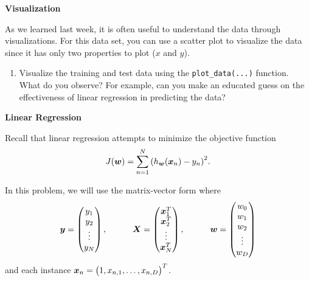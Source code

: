 \documentclass[11pt]{article}
\begin{document}
\vspace{10pt} {\large \textbf{Visualization} }

As we learned last week, it is often useful to understand the data through visualizations. For this data set, you can use a scatter plot to visualize the data since it has only two properties to plot ($x$ and $y$).

\begin{enumerate}

\item {} Visualize the training and test data using the \verb|plot_data(...)| function. What do you observe? For example, can you make an educated guess on the effectiveness of linear regression in predicting the data?


\solution{

}

\end{enumerate}



\newpage
\vspace{10pt} {\large \textbf{Linear Regression} }

Recall that linear regression attempts to minimize the objective function
\begin{equation*}
J(\boldsymbol{w}) =  \sum_{n=1}^{N}{\left(h_{\boldsymbol{w}}(\boldsymbol{x}_{n}) - y_{n}\right)^2}.
\end{equation*}

In this problem, we will use the matrix-vector form where
\begin{equation*}
\boldsymbol{y} =\begin{pmatrix}
y_{1}\\
y_{2}\\
\vdots\\
y_{N}
\end{pmatrix},
\quad \quad \quad
\boldsymbol{X} = \begin{pmatrix}
\boldsymbol{x}_{1}^T \\
\boldsymbol{x}_{2}^T  \\
\vdots  \\
\boldsymbol{x}_{N}^T  \\
\end{pmatrix},
\quad \quad \quad
\boldsymbol{w} = \begin{pmatrix}
w_0\\
w_1\\
w_2\\
\vdots\\
w_D
\end{pmatrix}
\end{equation*}
and each instance $\boldsymbol{x}_{n} = \bigl( 1, x_{n,1}, \ldots, x_{n,D} \bigr)^T$. 
\end{document}
